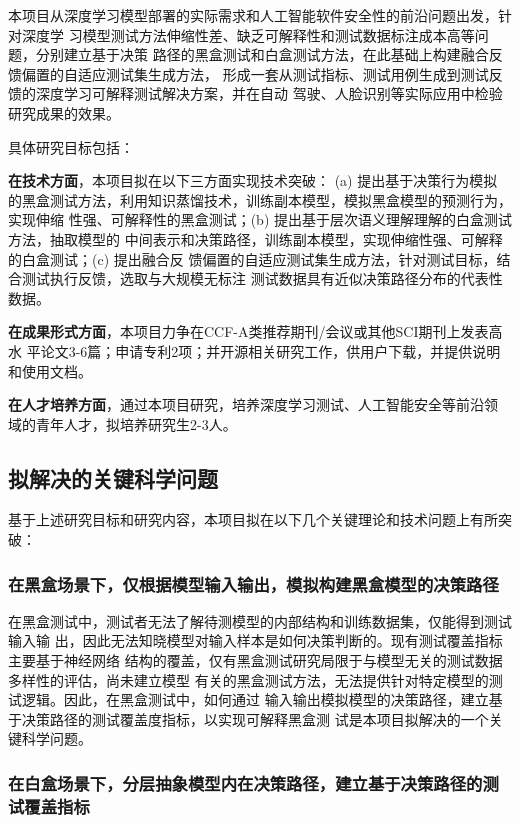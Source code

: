 本项目从深度学习模型部署的实际需求和人工智能软件安全性的前沿问题出发，针对深度学
习模型测试方法伸缩性差、缺乏可解释性和测试数据标注成本高等问题，分别建立基于决策
路径的黑盒测试和白盒测试方法，在此基础上构建融合反馈偏置的自适应测试集生成方法，
形成一套从测试指标、测试用例生成到测试反馈的深度学习可解释测试解决方案，并在自动
驾驶、人脸识别等实际应用中检验研究成果的效果。

具体研究目标包括：

\textbf{在技术方面}，本项目拟在以下三方面实现技术突破： (a) 提出基于决策行为模拟
的黑盒测试方法，利用知识蒸馏技术，训练副本模型，模拟黑盒模型的预测行为，实现伸缩
性强、可解释性的黑盒测试；(b) 提出基于层次语义理解理解的白盒测试方法，抽取模型的
中间表示和决策路径，训练副本模型，实现伸缩性强、可解释的白盒测试；(c) 提出融合反
馈偏置的自适应测试集生成方法，针对测试目标，结合测试执行反馈，选取与大规模无标注
测试数据具有近似决策路径分布的代表性数据。

\textbf{在成果形式方面}，本项目力争在CCF-A类推荐期刊/会议或其他SCI期刊上发表高水
平论文3-6篇；申请专利2项；并开源相关研究工作，供用户下载，并提供说明和使用文档。

\textbf{在人才培养方面}，通过本项目研究，培养深度学习测试、人工智能安全等前沿领
域的青年人才，拟培养研究生2-3人。

\subsection{拟解决的关键科学问题}

基于上述研究目标和研究内容，本项目拟在以下几个关键理论和技术问题上有所突破：

\subsubsection{在黑盒场景下，仅根据模型输入输出，模拟构建黑盒模型的决策路径}

在黑盒测试中，测试者无法了解待测模型的内部结构和训练数据集，仅能得到测试输入输
出，因此无法知晓模型对输入样本是如何决策判断的。现有测试覆盖指标主要基于神经网络
结构的覆盖，仅有黑盒测试研究局限于与模型无关的测试数据多样性的评估，尚未建立模型
有关的黑盒测试方法，无法提供针对特定模型的测试逻辑。因此，在黑盒测试中，如何通过
输入输出模拟模型的决策路径，建立基于决策路径的测试覆盖度指标，以实现可解释黑盒测
试是本项目拟解决的一个关键科学问题。


\subsubsection{在白盒场景下，分层抽象模型内在决策路径，建立基于决策路径的测试覆盖指标}

